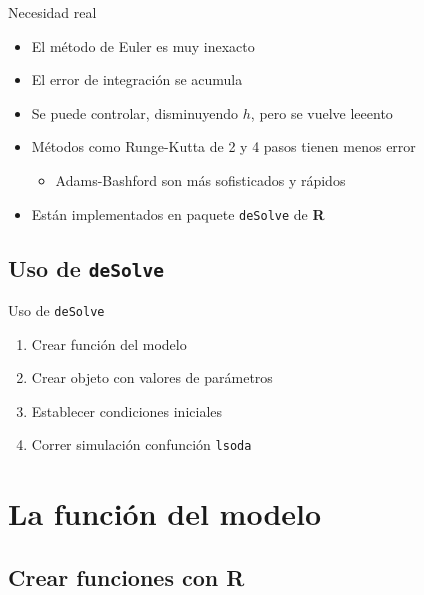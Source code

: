 \documentclass[
  11pt,
  ignorenonframetext,
]{beamer}
\providecommand{\tightlist}{%
  \setlength{\itemsep}{0pt}\setlength{\parskip}{0pt}}
\begin{document}
\begin{frame}[fragile]{Necesidad real}
\begin{itemize}
\item
  El método de Euler es muy inexacto
\item
  El error de integración se acumula
\item
  Se puede controlar, disminuyendo \(h\), pero se vuelve leeento
\item
  Métodos como Runge-Kutta de 2 y 4 pasos tienen menos error

  \begin{itemize}
  \tightlist
  \item
    Adams-Bashford son más sofisticados y rápidos
  \end{itemize}
\item
  Están implementados en paquete \texttt{deSolve} de \textbf{R}
\end{itemize}
\end{frame}

\hypertarget{uso-de-desolve}{%
\subsection{\texorpdfstring{Uso de
\texttt{deSolve}}{Uso de deSolve}}\label{uso-de-desolve}}

\begin{frame}[fragile]{Uso de \texttt{deSolve}}
\begin{enumerate}
\item
  Crear función del modelo
\item
  Crear objeto con valores de parámetros
\item
  Establecer condiciones iniciales
\item
  Correr simulación confunción \texttt{lsoda}
\end{enumerate}
\end{frame}

\hypertarget{la-funciuxf3n-del-modelo}{%
\section{La función del modelo}\label{la-funciuxf3n-del-modelo}}

\hypertarget{crear-funciones-con-r}{%
\subsection{\texorpdfstring{Crear funciones con
\textbf{R}}{Crear funciones con R}}\label{crear-funciones-con-r}}
\end{document}
